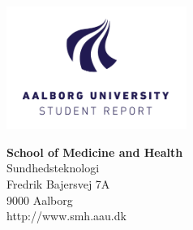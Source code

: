 

{}
\thispagestyle{empty}

\begin{minipage}[t]{0.48\textwidth}
\vspace*{-25pt}			%
\includegraphics[height=4cm]{Billeder/AAU-logo-stud-UK-RGB}
\end{minipage}
\hfill
\begin{minipage}[t]{0.48\textwidth}
{\small 
\textbf{School of Medicine and Health}  \\
Sundhedsteknologi \\
Fredrik Bajersvej 7A \\
9000 Aalborg \\
http://www.smh.aau.dk}
\end{minipage}

\vspace*{1cm}

